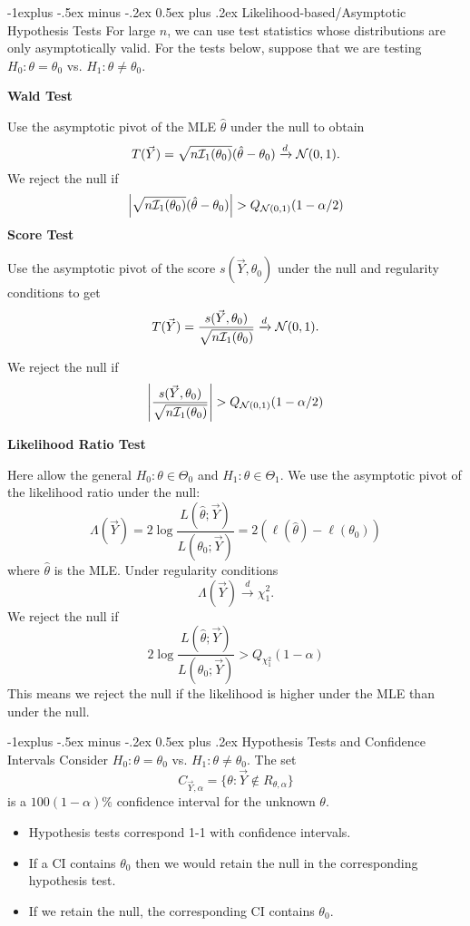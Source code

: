 \documentclass[10pt,landscape]{article}
\makeatletter
\renewcommand{\subsection}{\@startsection{subsection}{2}{0mm}%
                                {-1explus -.5ex minus -.2ex}%
                                {0.5ex plus .2ex}%
                                {\normalfont\normalsize\bfseries}}
\makeatother
\begin{document}
\begin{multicols*}{3}
\subsection{Likelihood-based/Asymptotic Hypothesis Tests}
For large $n$, we can use test statistics whose distributions are only asymptotically valid. For the tests below, suppose that we are testing $H_0:\theta = \theta_0$ vs. $H_1:\theta \neq \theta_0$.

\textbf{Wald Test}

Use the asymptotic pivot of the MLE $\hat{\theta}$ under the null to obtain $$T(\vec Y)=\sqrt{n\mathcal{I}_1(\theta_0)}(\hat{\theta}-\theta_0)\xrightarrow{d}\mathcal{N}(0,1).$$
We reject the null if
$$\left|\sqrt{n\mathcal{I}_1(\theta_0)}(\hat\theta-\theta_0)\right|>Q_{\cN(0,1)}(1-\alpha/2)$$
\textbf{Score Test}

Use the asymptotic pivot of the score $s(\vec Y,\theta_0)$ under the null and regularity conditions to get $$T(\vec Y)=\frac{s(\vec Y,\theta_0)}{\sqrt{n\mathcal{I}_1(\theta_0)}}\xrightarrow{d} \mathcal{N}(0,1).$$

We reject the null if
$$\left|\frac{s(\vec Y,\theta_0)}{\sqrt{n\mathcal{I}_1(\theta_0)}}\right|>Q_{\cN(0,1)}(1-\alpha/2)$$

\textbf{Likelihood Ratio Test}

Here allow the general $H_0:\theta\in\Theta_0$ and $H_1:\theta\in\Theta_1$. We use the asymptotic pivot of the likelihood ratio under the null: $$\Lambda(\vec Y)=2\log \frac{L(\hat{\theta};\vec Y)}{L(\theta_0;\vec Y)}=2(\ell(\hat{\theta})-\ell(\theta_0)) $$
where $\hat\theta$ is the MLE. Under regularity conditions
$$\Lambda(\vec Y)\xrightarrow{d}\chi_1^2.$$ We reject the null if
$$
2\log \frac{L(\hat{\theta};\vec Y)}{L(\theta_0;\vec Y)}>Q_{\chi^2_1}(1-\alpha)
$$
This means we reject the null if the likelihood is higher under the MLE than under the null.

\subsection{Hypothesis Tests and Confidence Intervals}
Consider $H_0:\theta=\theta_0$ vs. $H_1:\theta\neq\theta_0$. The set
$$
C_{\vec{Y},\alpha}=\{\theta:\vec{Y}\not\in R_{\theta,\alpha}\}
$$
is a $100(1-\alpha)\%$ confidence interval for the unknown $\theta$.
\begin{itemize}
    \item Hypothesis tests correspond 1-1 with confidence intervals.
    \item If a CI contains $\theta_0$ then we would retain the null in the corresponding hypothesis test.
    \item If we retain the null, the corresponding CI contains $\theta_0$.
\end{itemize}


\end{multicols*}
\end{document}
